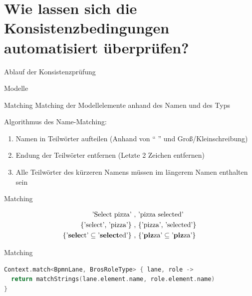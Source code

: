 \section{Wie lassen sich die Konsistenzbedingungen automatisiert überprüfen?}

\begin{frame}{Ablauf der Konsistenzprüfung}
  
\end{frame}

\begin{frame}{Modelle}
  
\end{frame}

\begin{frame}{Matching}
  Matching der Modellelemente anhand des Namen und des Typs

  Algorithmus des Name-Matching:
  \begin{enumerate}
    \item Namen in Teilwörter aufteilen (Anhand von `` '' und Groß/Kleinschreibung)
    \item Endung der Teilwörter entfernen (Letzte 2 Zeichen entfernen)
    \item Alle Teilwörter des kürzeren Namens müssen im längerem Namen enthalten sein
  \end{enumerate}
\end{frame}
\begin{frame}{Matching}
  \begin{figure}
    \centering
    \begin{align}
        \text{'Select pizza'}\ ,&\ \text{'pizza selected'} \nonumber\\
        \text{\{'select', 'pizza'\}}\ ,&\ \text{\{'pizza', 'selected'\}} \nonumber\\
        \text{\{'\textbf{sele}ct'} \subseteq \text{'\textbf{select}ed'\}}\ ,&\ \text{\{'\textbf{piz}za'} \subseteq \text{'\textbf{piz}za'\}} \nonumber
    \end{align}
    \label{eq:name_matching}
  \end{figure}
\end{frame}
\begin{frame}[fragile]{Matching}
\begin{lstlisting}[language=Kotlin]
Context.match<BpmnLane, BrosRoleType> { lane, role ->
  return matchStrings(lane.element.name, role.element.name)
}
\end{lstlisting}
\end{frame}

